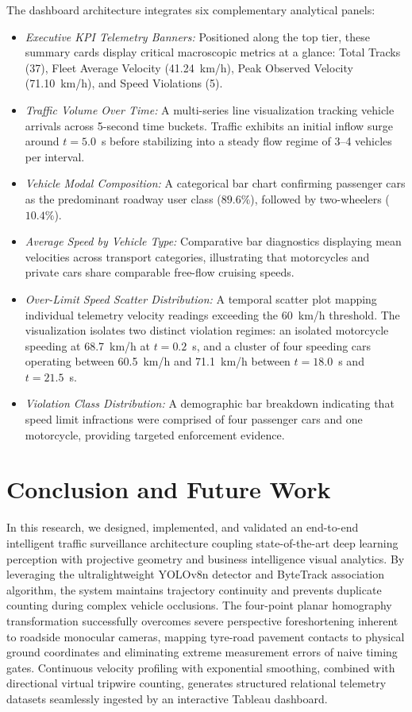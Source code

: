 \documentclass[conference]{IEEEtran}
\begin{document}
The dashboard architecture integrates six complementary analytical panels:
\begin{itemize}
    \item[\textit{i)}] \textit{Executive KPI Telemetry Banners:} Positioned along the top tier, these summary cards display critical macroscopic metrics at a glance: Total Tracks (37), Fleet Average Velocity (41.24~km/h), Peak Observed Velocity (71.10~km/h), and Speed Violations (5).
    \item[\textit{ii)}] \textit{Traffic Volume Over Time:} A multi-series line visualization tracking vehicle arrivals across 5-second time buckets. Traffic exhibits an initial inflow surge around $t=5.0$~s before stabilizing into a steady flow regime of 3--4 vehicles per interval.
    \item[\textit{iii)}] \textit{Vehicle Modal Composition:} A categorical bar chart confirming passenger cars as the predominant roadway user class ($89.6\%$), followed by two-wheelers ($10.4\%$).
    \item[\textit{iv)}] \textit{Average Speed by Vehicle Type:} Comparative bar diagnostics displaying mean velocities across transport categories, illustrating that motorcycles and private cars share comparable free-flow cruising speeds.
    \item[\textit{v)}] \textit{Over-Limit Speed Scatter Distribution:} A temporal scatter plot mapping individual telemetry velocity readings exceeding the 60~km/h threshold. The visualization isolates two distinct violation regimes: an isolated motorcycle speeding at 68.7~km/h at $t=0.2$~s, and a cluster of four speeding cars operating between 60.5~km/h and 71.1~km/h between $t=18.0$~s and $t=21.5$~s.
    \item[\textit{vi)}] \textit{Violation Class Distribution:} A demographic bar breakdown indicating that speed limit infractions were comprised of four passenger cars and one motorcycle, providing targeted enforcement evidence.
\end{itemize}

\section{Conclusion and Future Work}
In this research, we designed, implemented, and validated an end-to-end intelligent traffic surveillance architecture coupling state-of-the-art deep learning perception with projective geometry and business intelligence visual analytics. By leveraging the ultralightweight YOLOv8n detector and ByteTrack association algorithm, the system maintains trajectory continuity and prevents duplicate counting during complex vehicle occlusions. The four-point planar homography transformation successfully overcomes severe perspective foreshortening inherent to roadside monocular cameras, mapping tyre-road pavement contacts to physical ground coordinates and eliminating extreme measurement errors of naive timing gates. Continuous velocity profiling with exponential smoothing, combined with directional virtual tripwire counting, generates structured relational telemetry datasets seamlessly ingested by an interactive Tableau dashboard.
\end{document}
